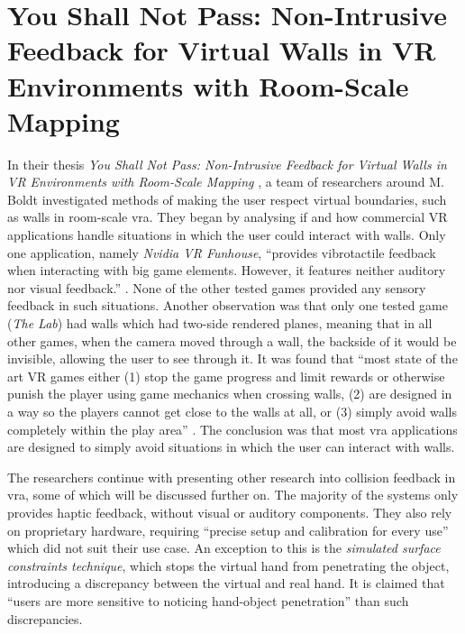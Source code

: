 \section{You Shall Not Pass: Non-Intrusive Feedback for Virtual Walls in VR Environments with Room-Scale Mapping}\label{section:YouShallNotPass}

In their thesis \textit{You Shall Not Pass: Non-Intrusive Feedback for Virtual Walls in VR Environments with Room-Scale Mapping} \autocite{nonIntrusiveFeedback}, a team of researchers around M. Boldt investigated methods of making the user respect virtual boundaries, such as walls in room-scale \gls{vra}.
\newline
They began by analysing if and how commercial VR applications handle situations in which the user could interact with walls. Only one application, namely \textit{Nvidia VR Funhouse}, \enquote{provides vibrotactile feedback when interacting with big game elements. However, it features neither auditory nor visual feedback.} \autocite[p. ~1]{nonIntrusiveFeedback}. None of the other tested games provided any sensory feedback in such situations.
\newline
Another observation was that only one tested game (\textit{The Lab}) had walls which had two-side rendered planes, meaning that in all other games, when the camera moved through a wall, the backside of it would be invisible, allowing the user to see through it.
\newline
It was found that \enquote{most state of the art VR games either (1) stop the game progress and limit rewards or otherwise punish the player using game mechanics when crossing walls, (2) are designed in a way so the players cannot get close to the walls at all, or (3) simply avoid walls completely within the play area} \autocite[p. ~2]{nonIntrusiveFeedback}. The conclusion was that most \gls{vra} applications are designed to simply avoid situations in which the user can interact with walls.
\newline

The researchers continue with presenting other research into collision feedback in \gls{vra}, some of which will be discussed further on.
\newline
The majority of the systems only provides haptic feedback, without visual or auditory components. They also rely on proprietary hardware, requiring \enquote{precise setup and calibration for every use} \autocite[p. ~2]{nonIntrusiveFeedback} which did not suit their use case. An exception to this is the \textit{simulated surface constraints technique}, which stops the virtual hand from penetrating the object, introducing a discrepancy between the virtual and real hand. It is claimed that \enquote{users are more sensitive to noticing hand-object penetration} \autocite[p. ~3]{nonIntrusiveFeedback} than such discrepancies.
\newline

